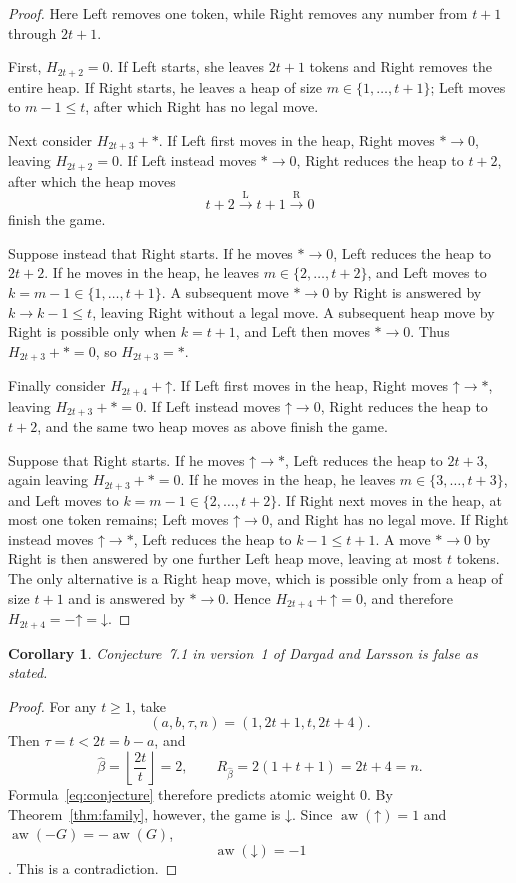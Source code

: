 \documentclass[11pt]{amsart}
\newtheorem{corollary}[theorem]{Corollary}
\theoremstyle{remark}
\newcommand{\Up}{\mathord{\uparrow}}
\newcommand{\Down}{\mathord{\downarrow}}
\newcommand{\aw}{\operatorname{aw}}
\begin{document}
\begin{proof}
Here Left removes one token, while Right removes any number from
$t+1$ through $2t+1$.

First, $H_{2t+2}=0$. If Left starts, she leaves $2t+1$ tokens and Right
removes the entire heap. If Right starts, he leaves a heap of size
$m\in\{1,\dots,t+1\}$; Left moves to $m-1\leq t$, after which Right has
no legal move.

Next consider $H_{2t+3}+*$. If Left first moves in the heap, Right moves
$*\to0$, leaving $H_{2t+2}=0$. If Left instead moves $*\to0$, Right
reduces the heap to $t+2$, after which the heap moves
\[
  t+2\xrightarrow{\mathrm L}t+1\xrightarrow{\mathrm R}0
\]
finish the game.

Suppose instead that Right starts. If he moves $*\to0$, Left reduces the
heap to $2t+2$. If he moves in the heap, he leaves
$m\in\{2,\dots,t+2\}$, and Left moves to
$k=m-1\in\{1,\dots,t+1\}$. A subsequent move $*\to0$ by Right is
answered by $k\to k-1\leq t$, leaving Right without a legal move. A
subsequent heap move by Right is possible only when $k=t+1$, and Left
then moves $*\to0$. Thus $H_{2t+3}+*=0$, so $H_{2t+3}=*$.

Finally consider $H_{2t+4}+\Up$. If Left first moves in the heap, Right
moves $\Up\to *$, leaving $H_{2t+3}+*=0$. If Left instead moves
$\Up\to0$, Right reduces the heap to $t+2$, and the same two heap moves
as above finish the game.

Suppose that Right starts. If he moves $\Up\to *$, Left reduces the heap
to $2t+3$, again leaving $H_{2t+3}+*=0$. If he moves in the heap, he
leaves $m\in\{3,\dots,t+3\}$, and Left moves to
$k=m-1\in\{2,\dots,t+2\}$. If Right next moves in the heap, at most one
token remains; Left moves $\Up\to0$, and Right has no legal move. If
Right instead moves $\Up\to *$, Left reduces the heap to
$k-1\leq t+1$. A move $*\to0$ by Right is then answered by one further
Left heap move, leaving at most $t$ tokens. The only alternative is a
Right heap move, which is possible only from a heap of size $t+1$ and
is answered by $*\to0$. Hence $H_{2t+4}+\Up=0$, and therefore
$H_{2t+4}=-\Up=\Down$.
\end{proof}

\begin{corollary}
Conjecture~7.1 in version~1 of Dargad and Larsson \cite{DL} is false
as stated.
\end{corollary}

\begin{proof}
For any $t\geq1$, take
\[
  (a,b,\tau,n)=(1,2t+1,t,2t+4).
\]
Then $\tau=t<2t=b-a$, and
\[
  \widehat\beta
  =\left\lfloor\frac{2t}{t}\right\rfloor=2,
  \qquad
  R_{\widehat\beta}=2(1+t+1)=2t+4=n.
\]
Formula~\eqref{eq:conjecture} therefore predicts atomic weight $0$.
By Theorem~\ref{thm:family}, however, the game is $\Down$. Since
$\aw(\Up)=1$ and $\aw(-G)=-\aw(G)$,
\[
  \aw(\Down)=-1
\]
\cite[Definition~A.17 and Lemma~A.19(1)]{DL}. This is a contradiction.
\end{proof}
\end{document}
